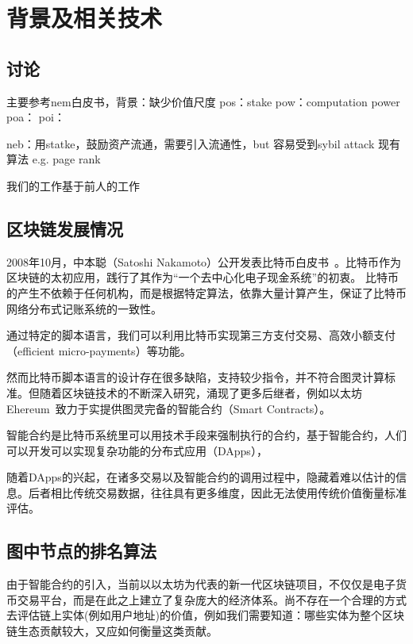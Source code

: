 
\section{背景及相关技术}
\subsection{讨论}
主要参考nem白皮书，背景：缺少价值尺度
pos：stake
pow：computation power
poa：
poi：

neb：用statke，鼓励资产流通，需要引入流通性，but 容易受到sybil attack
现有算法 e.g. page rank

我们的工作基于前人的工作

\subsection{区块链发展情况}
2008年10月，中本聪（Satoshi Nakamoto）公开发表比特币白皮书~\cite{Nakamoto2008}。比特币作为区块链的太初应用，践行了其作为“一个去中心化电子现金系统”的初衷。 比特币的产生不依赖于任何机构，而是根据特定算法，依靠大量计算产生，保证了比特币网络分布式记账系统的一致性。

通过特定的脚本语言，我们可以利用比特币实现第三方支付交易、高效小额支付（efficient micro-payments）等功能。

然而比特币脚本语言的设计存在很多缺陷，支持较少指令，并不符合图灵计算标准。但随着区块链技术的不断深入研究，涌现了更多后继者，例如以太坊Ehereum~\cite{buterin2013ethereum}致力于实提供图灵完备的智能合约（Smart Contracts）。

智能合约是比特币系统里可以用技术手段来强制执行的合约，基于智能合约，人们可以开发可以实现复杂功能的分布式应用（DApps），

随着DApps的兴起，在诸多交易以及智能合约的调用过程中，隐藏着难以估计的信息。后者相比传统交易数据，往往具有更多维度，因此无法使用传统价值衡量标准评估。





\subsection{图中节点的排名算法}
由于智能合约的引入，当前以以太坊为代表的新一代区块链项目，不仅仅是电子货币交易平台，而是在此之上建立了复杂庞大的经济体系。尚不存在一个合理的方式去评估链上实体(例如用户地址)的价值，例如我们需要知道：哪些实体为整个区块链生态贡献较大，又应如何衡量这类贡献。

